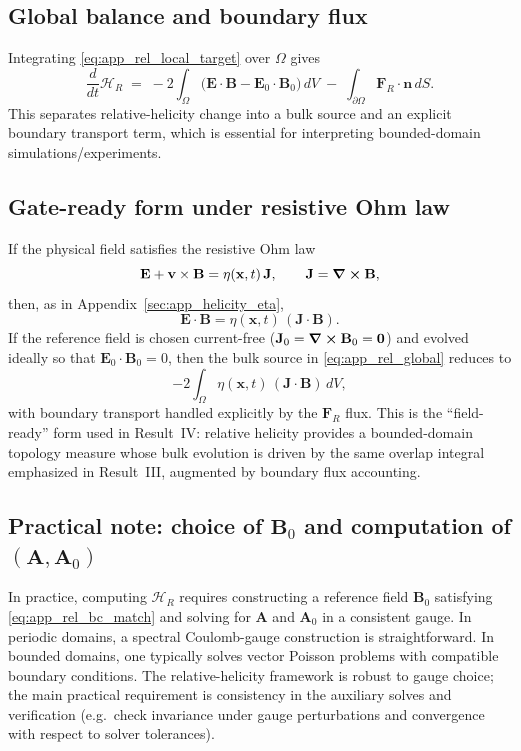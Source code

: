 \documentclass[11pt]{article}
\theoremstyle{plain}
\theoremstyle{definition}
\theoremstyle{remark}
\newcommand{\A}{\mathbf{A}}
\newcommand{\B}{\mathbf{B}}
\newcommand{\E}{\mathbf{E}}
\newcommand{\J}{\mathbf{J}}
\newcommand{\vfield}{\mathbf{v}}
\begin{document}
\subsection{Global balance and boundary flux}
Integrating \eqref{eq:app_rel_local_target} over $\Omega$ gives
\begin{equation}\label{eq:app_rel_global}
  \frac{d}{dt}\mathcal{H}_R
  \;=\;
  -2\int_{\Omega}\big(\E\cdot\B - \E_0\cdot\B_0\big)\,dV
  \;-\;
  \int_{\partial\Omega}\mathbf{F}_R\cdot\mathbf{n}\,dS.
\end{equation}
This separates relative-helicity change into a bulk source and an explicit boundary transport term,
which is essential for interpreting bounded-domain simulations/experiments.

\subsection{Gate-ready form under resistive Ohm law}
If the physical field satisfies the resistive Ohm law
\begin{equation}\label{eq:app_rel_ohm}
  \E + \vfield\times\B = \eta(\mathbf{x},t)\,\J,
  \qquad \J=\curl\B,
\end{equation}
then, as in Appendix~\ref{sec:app_helicity_eta},
\begin{equation}\label{eq:app_rel_EdotB}
  \E\cdot\B = \eta(\mathbf{x},t)\,(\J\cdot\B).
\end{equation}
If the reference field is chosen current-free ($\J_0=\curl\B_0=\mathbf{0}$) and evolved ideally so that
$\E_0\cdot\B_0=0$, then the bulk source in \eqref{eq:app_rel_global} reduces to
\begin{equation}\label{eq:app_rel_source_gate}
  -2\int_{\Omega}\eta(\mathbf{x},t)\,(\J\cdot\B)\,dV,
\end{equation}
with boundary transport handled explicitly by the $\mathbf{F}_R$ flux. This is the ``field-ready'' form
used in Result~IV: relative helicity provides a bounded-domain topology measure whose bulk evolution is
driven by the same overlap integral emphasized in Result~III, augmented by boundary flux accounting.

\subsection{Practical note: choice of $\B_0$ and computation of $(\A,\A_0)$}
In practice, computing $\mathcal{H}_R$ requires constructing a reference field $\B_0$ satisfying
\eqref{eq:app_rel_bc_match} and solving for $\A$ and $\A_0$ in a consistent gauge. In periodic domains,
a spectral Coulomb-gauge construction is straightforward. In bounded domains, one typically solves
vector Poisson problems with compatible boundary conditions. The relative-helicity framework is robust
to gauge choice; the main practical requirement is consistency in the auxiliary solves and verification
(e.g.\ check invariance under gauge perturbations and convergence with respect to solver tolerances).
\end{document}
